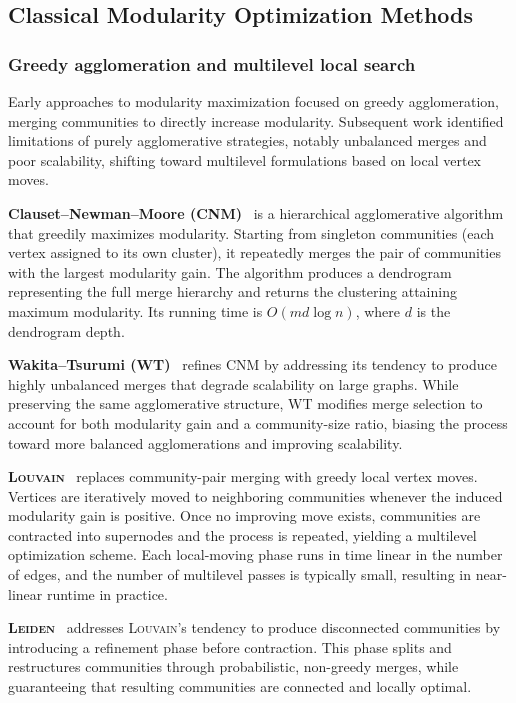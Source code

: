\documentclass[../paper.tex]{subfiles}
\begin{document}
\subsection{Classical Modularity Optimization Methods}

\subsubsection{Greedy agglomeration and multilevel local search}

Early approaches to modularity maximization focused on greedy agglomeration, merging communities to directly increase modularity.
Subsequent work identified limitations of purely agglomerative strategies, notably unbalanced merges and poor scalability, shifting toward multilevel formulations based on local vertex moves.

\textbf{Clauset--Newman--Moore (\textsc{CNM})}~\cite{cnm2004} is a hierarchical agglomerative algorithm that greedily maximizes modularity.
Starting from singleton communities (each vertex assigned to its own cluster), it repeatedly merges the pair of communities with the largest modularity gain.
The algorithm produces a dendrogram representing the full merge hierarchy and returns the clustering attaining maximum modularity. Its running time is $O(md \log n)$, where $d$ is the dendrogram depth.

\textbf{Wakita--Tsurumi (\textsc{WT})}~\cite{wt2007} refines \textsc{CNM} by addressing its tendency to produce highly unbalanced merges that degrade scalability on large graphs.
While preserving the same agglomerative structure, \textsc{WT} modifies merge selection to account for both modularity gain and a community-size ratio, biasing the process toward more balanced agglomerations and improving scalability.

\textbf{\textsc{Louvain}}~\cite{louvain2008} replaces community-pair merging with greedy local vertex moves.
Vertices are iteratively moved to neighboring communities whenever the induced modularity gain is positive.
Once no improving move exists, communities are contracted into supernodes and the process is repeated, yielding a multilevel optimization scheme.
Each local-moving phase runs in time linear in the number of edges, and the number of multilevel passes is typically small, resulting in near-linear runtime in practice.

\textbf{\textsc{Leiden}}~\cite{leiden2019} addresses \textsc{Louvain}'s tendency to produce disconnected communities by introducing a refinement phase before contraction.
This phase splits and restructures communities through probabilistic, non-greedy merges, while guaranteeing that resulting communities are connected and locally optimal.
\end{document}
